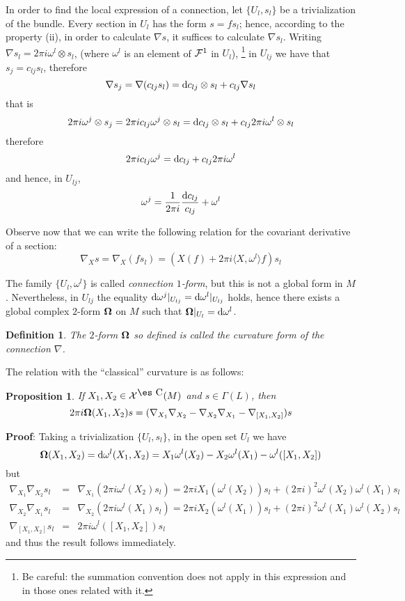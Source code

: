 \documentclass[12pt]{article}
\newtheorem{prop}{Proposition}
\newtheorem{definition}{Definition}
\def\beq{\begin{equation}}
\def\eeq{\end{equation}}
\def\beann{\begin{eqnarray*}}
\def\eeann{\end{eqnarray*}}
\def\qed{\ifvmode\removelastskip\fi
{\unskip\nobreak\hfil\penalty50\hbox{}\nobreak\hfil
\hbox{\vrule height1.2ex width1.2ex}\parfillskip=0pt
\finalhyphendemerits=0 \par\smallskip}}
\def\d{{\rm d}}
\def\curv{{\bf \Omega}}
\def\Complex{\mbox{\es C}}
\begin{document}
In order to find the local expression of a connection,
let $\{ U_l,s_l \}$ be a trivialization of the bundle.
Every section in $U_l$ has the form $s=fs_l$;
hence, according to the property (ii),
in order to calculate $\nabla s$,
it suffices to calculate $\nabla s_l$.
Writing
$\nabla s_l = 2\pi i \omega^l  \otimes s_l$,
(where $\omega^l $ is an element of
${\cal F}^1$ in $U_l$),%
\footnote{
Be careful: the summation convention does not apply in this expression
and
in those ones related with it.
}
in $U_{l j}$ we have that
$s_j = c_{l j}s_l$,
therefore
$$
\nabla s_j =
\nabla (c_{l j}s_l) =
\d c_{l j} \otimes s_l + c_{l j} \nabla s_l
$$
that is
$$
2\pi i \omega^j \otimes s_j =
2\pi i c_{l j} \omega^j \otimes s_l =
\d c_{l j} \otimes s_l + c_{l j} 2\pi i \omega^l  \otimes s_l
$$
therefore
$$
2\pi i c_{l j} \omega^j =
\d c_{l j} + c_{l j} 2\pi i \omega^l
$$
and hence, in $U_{l j}$,
$$
\omega^j =
\frac{1}{2\pi i} \frac{\d c_{l j}}{c_{l j}} + \omega^l
$$

Observe now that we can write the following relation
for the covariant derivative of a section:
\beq
\nabla_X s =
\nabla_X (fs_l) =
(X(f) + 2\pi i \langle X,\omega^l  \rangle f) s_l
\label{expcon}
\eeq

The family
$\{ U_l,\omega^l  \}$
is called
{\it connection $1$-form},
but this is not a global form in $M$.
Nevertheless, in $U_{l j}$
the equality
$\d \omega^j \vert_{U_{l j}} = \d \omega^l  \vert_{U_{l j}}$
holds,
hence there exists a global complex $2$-form
$\curv $ on $M$ such that
$\curv  \vert_{U_l} = \d \omega^l $.

\begin{definition}
The $2$-form $\curv $
so defined is called the
{\rm curvature form} of the connection $\nabla$.
\label{cur}
\end{definition}

The relation with the ``classical'' curvature
is as follows:

\begin{prop}
If $X_1, X_2 \in {\cal X}^{\Complex}(M)$
and $s \in \Gamma (L)$, then
$$
2\pi i \curv  (X_1,X_2)s =
(\nabla_{X_1}\nabla_{X_2} - \nabla_{X_2}\nabla_{X_1} -
\nabla_{[X_1,X_2]})s
$$
\label{clacur}
\end{prop}
{\bf Proof}: 
Taking a trivialization
$\{ U_l,s_l \}$,
in the open set $U_l$ we have
$$
\curv  (X_1,X_2) =
\d \omega^l (X_1,X_2) =
X_1 \omega^l (X_2) - X_2 \omega^l (X_1) - \omega^l  ([X_1,X_2])
$$
but
\beann
\nabla_{X_1} \nabla_{X_2}s_l
&=&
\nabla_{X_1}(2\pi i \omega^l (X_2)s_l)=
2\pi i X_1(\omega^l (X_2))s_l + (2\pi i)^2 \omega^l  (X_2) \omega^l
(X_1)s_l
\\
\nabla_{X_2} \nabla_{X_1}s_l
&=&
\nabla_{X_2}(2\pi i \omega^l (X_1)s_l)=
2\pi i X_2(\omega^l (X_1))s_l + (2\pi i)^2 \omega^l  (X_1) \omega^l
(X_2)s_l
\\
\nabla_{[X_1,X_2]}s_l
&=&
2\pi i \omega^l ([X_1,X_2])s_l
\eeann
and thus the result follows immediately.
\qed
\end{document}
